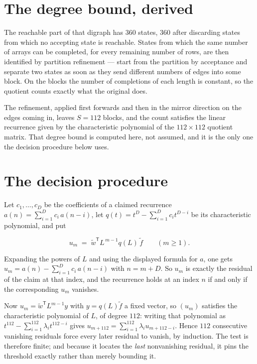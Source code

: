 \documentclass[11pt]{article}
\theoremstyle{definition}
\begin{document}
\section{The degree bound, derived}

The reachable part of that digraph has $360$ states, $360$ after discarding states from which no accepting state is reachable. States from which the same number of arrays can be completed, for every remaining number of rows, are then identified by partition refinement --- start from the partition by acceptance and separate two states as soon as they send different numbers of edges into some block. On the blocks the number of completions of each length is constant, so the quotient counts exactly what the original does.

The refinement, applied first forwards and then in the mirror direction on the edges coming in, leaves $S = 112$ blocks, and the count satisfies the linear recurrence given by the characteristic polynomial of the $112 \times 112$ quotient matrix. That degree bound is computed here, not assumed, and it is the only one the decision procedure below uses.

\section{The decision procedure}

Let $c_1,\dots,c_D$ be the coefficients of a claimed recurrence $a(n) = \sum_{i=1}^{D} c_i\,a(n-i)$, let $q(t) = t^{D} - \sum_{i=1}^{D} c_i t^{D-i}$ be its characteristic polynomial, and put

\[u_m \;=\; \tilde w^{\mathsf T} L^{\,m-1} q(L)\,\tilde f \qquad (m \ge 1).\]

Expanding the powers of $L$ and using the displayed formula for $a$, one gets $u_m = a(n) - \sum_{i=1}^{D} c_i\,a(n-i)$ with $n = m + D$. So $u_m$ is exactly the residual of the claim at that index, and the recurrence holds at an index $n$ if and only if the corresponding $u_m$ vanishes.

Now $u_m = \tilde w^{\mathsf T} L^{m-1} y$ with $y = q(L)\tilde f$ a fixed vector, so $(u_m)$ satisfies the characteristic polynomial of $L$, of degree $112$: writing that polynomial as $t^{112} - \sum_{i=1}^{112} \lambda_i t^{112-i}$ gives $u_{m+112} = \sum_{i=1}^{112} \lambda_i u_{m+112-i}$. Hence $112$ consecutive vanishing residuals force every later residual to vanish, by induction. The test is therefore finite; and because it locates the {\itshape last} nonvanishing residual, it pins the threshold exactly rather than merely bounding it.
\end{document}
